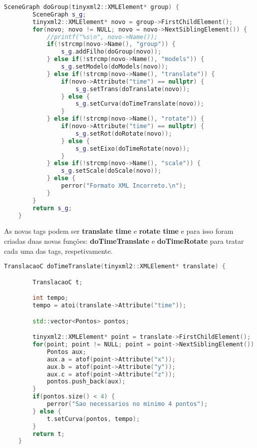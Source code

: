 \documentclass{article}
\begin{document}
\begin{file}
    \begin{lstlisting}[language=C++]
	SceneGraph doGroup(tinyxml2::XMLElement* group) {
	    SceneGraph s_g;
	    tinyxml2::XMLElement* novo = group->FirstChildElement();
	    for(novo; novo != NULL; novo = novo->NextSiblingElement()) {
	        //printf("%s\n", novo->Name());
	        if(!strcmp(novo->Name(), "group")) {
	            s_g.addFilho(doGroup(novo));
	        } else if(!strcmp(novo->Name(), "models")) {
	            s_g.setModelo(doModels(novo));
	        } else if(!strcmp(novo->Name(), "translate")) {
	            if(novo->Attribute("time") == nullptr) {
	                s_g.setTrans(doTranslate(novo));
	            } else {
	                s_g.setCurva(doTimeTranslate(novo));
	            }
	        } else if(!strcmp(novo->Name(), "rotate")) {
	            if(novo->Attribute("time") == nullptr) {
	                s_g.setRot(doRotate(novo));
	            } else {
	                s_g.setEixo(doTimeRotate(novo));
	            }
	        } else if(!strcmp(novo->Name(), "scale")) {
	            s_g.setScale(doScale(novo));
	        } else {
	            perror("Formato XML Incorreto.\n");
	        }
	    }
	    return s_g;
	}
    \end{lstlisting}
\end{file}
As novas tags podem ser \textbf{translate time} e \textbf{rotate time} e para isso foram criadas duas novas funções: \textbf{doTimeTranslate} e \textbf{doTimeRotate} para tratar cada uma das tags, respetivamente.

\begin{file}
    \begin{lstlisting}[language=C++]
	TranslacaoC doTimeTranslate(tinyxml2::XMLElement* translate) {

	    TranslacaoC t;

	    int tempo;
	    tempo = atoi(translate->Attribute("time"));

	    std::vector<Pontos> pontos;

	    tinyxml2::XMLElement* point = translate->FirstChildElement();
	    for(point; point != NULL; point = point->NextSiblingElement()) {
	        Pontos aux;
	        aux.a = atof(point->Attribute("x"));
	        aux.b = atof(point->Attribute("y"));
	        aux.c = atof(point->Attribute("z"));
	        pontos.push_back(aux);
	    }
	    if(pontos.size() < 4) {
	        perror("Sao necessarios no minimo 4 pontos");
	    } else {
	        t.setCurva(pontos, tempo);
	    }
	    return t;
	}
    \end{lstlisting}
\end{file}
\end{document}

